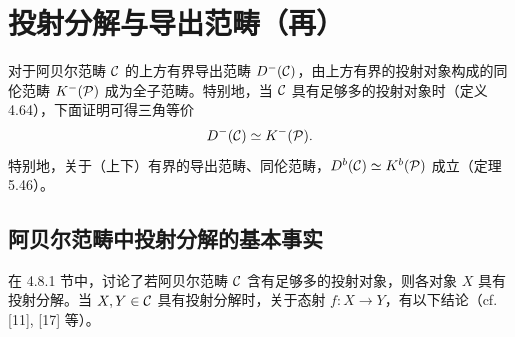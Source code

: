 
\section{投射分解与导出范畴（再）}

对于阿贝尔范畴 $\mathcal{C}$ 的上方有界导出范畴 $D^-(\mathcal{C})$，由上方有界的投射对象构成的同伦范畴 $K^-(\mathcal{P})$ 成为全子范畴。特别地，当 $\mathcal{C}$ 具有足够多的投射对象时（定义 4.64），下面证明可得三角等价
\[
  D^-(\mathcal{C})\simeq K^-(\mathcal{P}).
\]
特别地，关于（上下）有界的导出范畴、同伦范畴，$D^b(\mathcal{C})\simeq K^b(\mathcal{P})$ 成立（定理 5.46）。


\subsection{阿贝尔范畴中投射分解的基本事实}

在 4.8.1 节中，讨论了若阿贝尔范畴 $\mathcal{C}$ 含有足够多的投射对象，则各对象 $X$ 具有投射分解。当 $X, Y\in\mathcal{C}$ 具有投射分解时，关于态射 $f\colon X\to Y$，有以下结论（cf. [11], [17] 等）。

